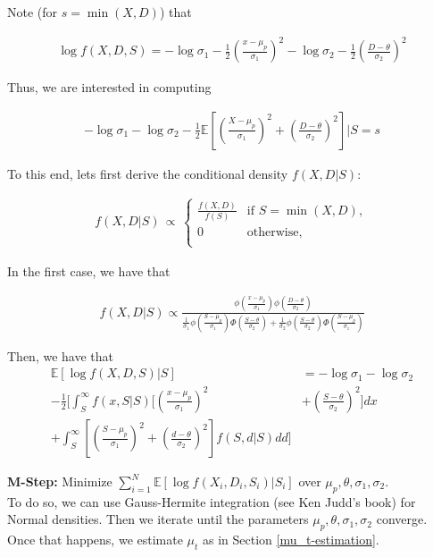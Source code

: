 \documentclass[11pt, oneside]{article}   	%
\theoremstyle{ModifiedStyle}
\begin{document}
			Note (for $s = \min(X,D)$) that

			\begin{align*}
				\log f(X,D,S) = -\log \sigma_1 - \frac{1}{2}(\frac{x-\mu_p}{\sigma_1})^2 - \log \sigma_2 - \frac{1}{2} (\frac{D-\theta}{\sigma_2})^2
			\end{align*}

			Thus, we are interested in computing

			\begin{align*}
				-\log \sigma_1 - \log \sigma_2 - \frac{1}{2} \mathbb{E}[(\frac{X-\mu_p}{\sigma_1})^2 + (\frac{D-\theta}{\sigma_2})^2] | S=s
			\end{align*}

			To this end, lets first derive the conditional density $f(X,D|S)$:

			\begin{align*}
			f(X,D|S) \,\propto\, \left \{\!\! \begin{array}{ll}
			\frac{f(X,D)}{f(S)} & \text{if } S= \min(X,D), \\
			0 & \text{otherwise}, \\
			\end{array} \right.
			\end{align*}

			In the first case, we have that

			\begin{align}
				f(X,D|S) \propto \frac{\phi(\frac{x-\mu_p}{\sigma_1}) \phi(\frac{D-\theta}{\sigma_2})}{\frac{1}{\sigma_1} \phi(\frac{S-\mu_p}{\sigma_1}) \Phi(\frac{S-\theta}{\sigma_2}) + \frac{1}{\sigma_2} \phi(\frac{S-\theta}{\sigma_2}) \Phi(\frac{S-\mu_p}{\sigma_1})}
			\end{align}

			Then, we have that
			\begin{align*}
				\mathbb{E}[\log f(X,D,S) | S] &= -\log \sigma_1 - \log \sigma_2 \\
				-\frac{1}{2}[\int_S^\infty f(x,S|S)[(\frac{x-\mu_p}{\sigma_1})^2 &+ (\frac{S-\theta}{\sigma_2})^2]dx \\
				+ \int_S^\infty [(\frac{S-\mu_p}{\sigma_1})^2 + (\frac{d-\theta}{\sigma_2})^2]f(S,d|S) dd]
			\end{align*}

			\noindent \textbf{M-Step:} Minimize $\sum_{i=1}^N \mathbb{E}[\log f(X_i,D_i,S_i)|S_i]$ over $\mu_p,\theta,\sigma_1,\sigma_2$. \\
			To do so, we can use Gauss-Hermite integration (see Ken Judd's book) for Normal densities. Then we iterate until the parameters $\mu_p,\theta,\sigma_1,\sigma_2$ converge. Once that happens, we estimate $\mu_t$ as in Section \ref{mu_t-estimation}.
\end{document}
